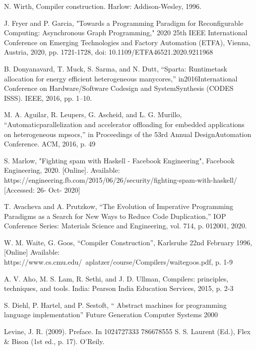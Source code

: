 \documentclass[11pt]{article}
\begin{document}
\begin{thebibliography}{9}

\bibitem{} 
N. Wirth, Compiler construction. Harlow: Addison-Wesley, 1996.

\bibitem{} 
J. Fryer and P. Garcia, "Towards a Programming Paradigm for Reconfigurable Computing: Asynchronous Graph Programming," 2020 25th IEEE International Conference on Emerging Technologies and Factory Automation (ETFA), Vienna, Austria, 2020, pp. 1721-1728, doi: 10.1109/ETFA46521.2020.9211968

\bibitem{}
B. Donyanavard, T. Muck, S. Sarma, and N. Dutt, “Sparta: Runtimetask allocation for energy efficient heterogeneous manycores,” in2016International Conference on Hardware/Software Codesign and SystemSynthesis (CODES  ISSS). IEEE, 2016, pp. 1–10.

\bibitem{}
M. A. Aguilar, R. Leupers, G. Ascheid, and L. G. Murillo, “Automaticparallelization and accelerator offloading for embedded applications on heterogeneous mpsocs,” in Proceedings of the 53rd Annual DesignAutomation Conference. ACM, 2016, p. 49

\bibitem{} 
S. Marlow, "Fighting spam with Haskell - Facebook Engineering", Facebook Engineering, 2020. [Online]. Available: https://engineering.fb.com/2015/06/26/security/fighting-spam-with-haskell/ 
[Accessed: 26- Oct- 2020]

\bibitem{}
T. Avacheva and A. Prutzkow, “The Evolution of Imperative Programming Paradigms as a Search for New Ways to Reduce Code Duplication,” IOP Conference Series: Materials Science and Engineering, vol. 714, p. 012001, 2020.

\bibitem{}
W. M. Waite, G. Goos, “Compiler Construction”, Karlsruhe 22nd February 1996, [Online] Available: https://www.cs.cmu.edu/~aplatzer/course/Compilers/waitegoos.pdf, p. 1-9

\bibitem{}
A. V. Aho, M. S. Lam, R. Sethi, and J. D. Ullman, Compilers: principles, techniques, and tools. India: Pearson India Education Services, 2015, p. 2-3

\bibitem{}
S. Diehl, P. Hartel, and P. Sestoft, “ Abstract machines for programming language implementation” Future Generation Computer Systems 2000


\bibitem{}
Levine, J. R. (2009). Preface. In 1024727333 786678555 S. S. Laurent (Ed.), Flex \& Bison (1st ed., p. 17). O'Reily.



\end{thebibliography}
\end{document}
